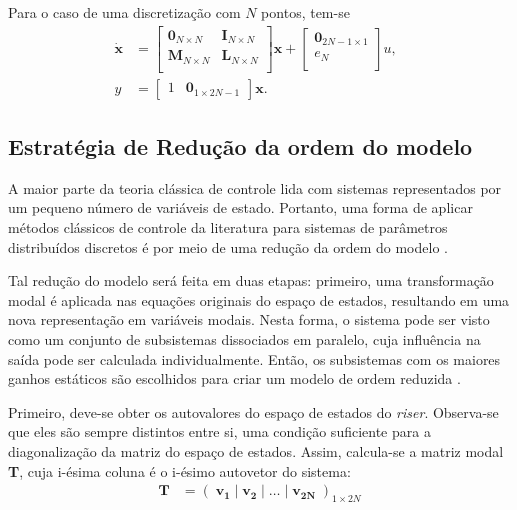  Para o caso de uma discretização com $N$ pontos, tem-se \begin{align}
 	\mathbf{\dot{x}} &= \left[\begin{array}{cc}
	\mathbf{0}_{N\times N} & \mathbf{I}_{N\times N}\\
	\mathbf{M}_{N\times N} & \mathbf{L}_{N\times N}\\
\end{array}\right] \mathbf{x} + \left[\begin{array}{c}
	\mathbf{0}_{2N-1\times 1}\\ e_N\\
\end{array} \right]u,\;\;\\
y &= \left[\begin{array}{cc}
	1 & \textbf{0}_{1\times 2N-1}
\end{array}\right]\textbf{x}.
 \end{align}


\subsection{Estratégia de Redução da ordem do modelo}

 A maior parte da teoria clássica de controle lida com sistemas representados por um pequeno número de variáveis de estado. Portanto, uma forma de aplicar métodos clássicos de controle da literatura para sistemas de parâmetros distribuídos discretos é por meio de uma redução da ordem do modelo \cite{fabricioIFAC}.

 Tal redução do modelo será feita em duas etapas: primeiro, uma transformação modal é aplicada nas equações originais do espaço de estados, resultando em uma nova representação em variáveis modais. Nesta forma, o sistema pode ser visto como um conjunto de subsistemas dissociados em paralelo, cuja influência na saída pode ser calculada individualmente. Então, os subsistemas com os maiores ganhos estáticos são escolhidos para criar um modelo de ordem reduzida \cite{fabricioIFAC}.

 Primeiro, deve-se obter os autovalores do espaço de estados do \textit{riser}. Observa-se que eles são sempre distintos entre si, uma condição suficiente para a diagonalização da matriz do espaço de estados. Assim, calcula-se a matriz modal \textbf{T}, cuja i-ésima coluna é o i-ésimo autovetor do sistema: \begin{align}
	\mathbf{T} &= \left(\;\mathbf{v_1}\;|\;\mathbf{v_2}\;|\;\ldots\;|\;\mathbf{v_{2N}}\;\right)_{1\times 2N}
\end{align}

